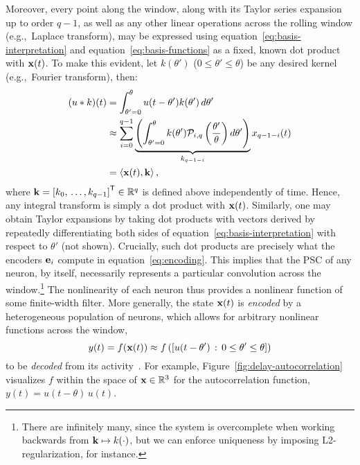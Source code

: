 Moreover, every point along the window, along with its Taylor series expansion up to order $q-1$, as well as any other linear operations across the rolling window (e.g.,~Laplace transform), may be expressed using equation~\ref{eq:basis-interpretation} and equation~\ref{eq:basis-functions} as a fixed, known dot product with $\mathbf{x}(t)$.
To make this evident, let $k(\theta')$ ($0 \le \theta' \le \theta$) be any desired kernel (e.g.,~Fourier transform), then:
\begin{equation} \label{eq:delay-linear-transform}
\begin{aligned}
(u \ast k)(t) &= \int_{\theta'=0}^{\theta} u(t - \theta') k(\theta') \, d\theta' \\
&\approx \sum_{i=0}^{q-1} \underbrace{\left( \int_{\theta'=0}^{\theta} k(\theta') \mathcal{P}_{i,q} \left(\frac{\theta'}{\theta} \right) d\theta' \right)}_{k_{q -1-i}} x_{q-1-i}(t) \\
&= \left\langle \mathbf{x}(t)\text{,}\, \mathbf{k} \right\rangle \text{,}
\end{aligned}
\end{equation}
where $\mathbf{k} = {\left[ k_0\text{,}\, \ldots \text{,}\, k_{q-1} \right]}^\mathsf{T} \in \mathbb{R}^q$ is defined above independently of time.
Hence, any integral transform is simply a dot product with $\mathbf{x}(t)$.
Similarly, one may obtain Taylor expansions by taking dot products with vectors derived by repeatedly differentiating both sides of equation~\ref{eq:basis-interpretation} with respect to $\theta'$ (not shown).
Crucially, such dot products are precisely what the encoders $\mathbf{e}_i$ compute in equation~\ref{eq:encoding}.
This implies that the PSC of any neuron, by itself, necessarily represents a particular convolution across the window.\footnote{%
There are infinitely many, since the system is overcomplete when working backwards from $\mathbf{k} \mapsto k(\cdot)$, but we can enforce uniqueness by imposing L2-regularization, for instance.}
The nonlinearity of each neuron thus provides a nonlinear function of some finite-width filter.
More generally, the state $\mathbf{x}(t)$ is \emph{encoded} by a heterogeneous population of neurons, which allows for arbitrary nonlinear functions across the window,
$$y(t) = f(\mathbf{x}(t)) \approx f\left(\left[ u(t - \theta') \,:\, 0 \le \theta' \le \theta \right]\right)$$
to be \emph{decoded} from its activity~\citep{eliasmith2003a}.
For example, Figure~\ref{fig:delay-autocorrelation} visualizes $f$ within the space of $\mathbf{x} \in \mathbb{R}^3$ for the autocorrelation function, $y(t) = u(t - \theta)\, u(t)$.

